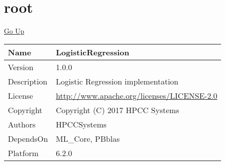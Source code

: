 \chapter*{\color{headtoc} root}
\hypertarget{ecldoc:toc:root}{}
\hyperlink{ecldoc:toc:}{Go Up}

\begin{tabularx}{\textwidth}{|l|X|}
\hline
Name &
LogisticRegression
 \\
\hline
Version &
1.0.0
 \\
\hline
Description &
Logistic Regression implementation
 \\
\hline
License &
\url{http://www.apache.org/licenses/LICENSE-2.0}
 \\
\hline
Copyright &
Copyright (C) 2017 HPCC Systems
 \\
\hline
Authors &
HPCCSystems
 \\
\hline
DependsOn &
ML\_Core, PBblas
 \\
\hline
Platform &
6.2.0
 \\
\hline
\end{tabularx}

